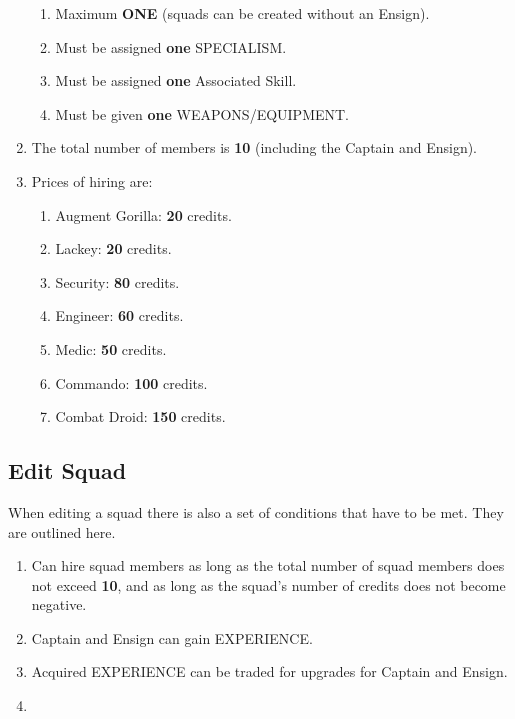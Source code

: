 \documentclass[12pt,a4paper]{article}
\begin{document}
\begin{enumerate}
\begin{enumerate}
                \item Maximum \textbf{ONE} (squads can be created without an Ensign).
                \item Must be assigned \textbf{one} SPECIALISM.
                \item Must be assigned \textbf{one} Associated Skill.
                \item Must be given \textbf{one} WEAPONS/EQUIPMENT.
               \end{enumerate}
 \item The total number of members is \textbf{10} (including the Captain and Ensign).
 \item Prices of hiring are: \begin{enumerate}
                              \item Augment Gorilla: \textbf{20} credits.
                              \item Lackey: \textbf{20} credits.
                              \item Security: \textbf{80} credits.
                              \item Engineer: \textbf{60} credits.
                              \item Medic: \textbf{50} credits.
                              \item Commando: \textbf{100} credits.
                              \item Combat Droid: \textbf{150} credits.
                             \end{enumerate}
\end{enumerate}

\subsection{Edit Squad}

When editing a squad there is also a set of conditions that have to be met. They are outlined here.

\begin{enumerate}
 \item Can hire squad members as long as the total number of squad members does not exceed \textbf{10}, and as long as the squad's number of credits does not become negative.
 \item Captain and Ensign can gain EXPERIENCE.
 \item Acquired EXPERIENCE can be traded for upgrades for Captain and Ensign.
 \item 
\end{enumerate}
\end{document}
